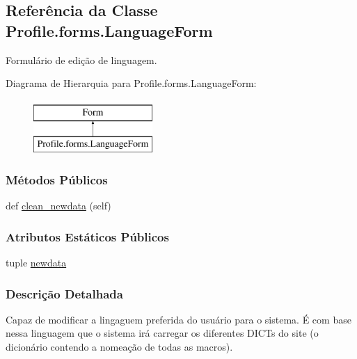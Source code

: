 \hypertarget{classProfile_1_1forms_1_1LanguageForm}{}\subsection{Referência da Classe Profile.\+forms.\+Language\+Form}
\label{classProfile_1_1forms_1_1LanguageForm}


Formulário de edição de linguagem.  


Diagrama de Hierarquia para Profile.\+forms.\+Language\+Form\+:\begin{figure}[H]
\begin{center}
\leavevmode
\includegraphics[height=2.000000cm]{de/d9b/classProfile_1_1forms_1_1LanguageForm}
\end{center}
\end{figure}
\subsubsection*{Métodos Públicos}
\begin{DoxyCompactItemize}
\item 
def \hyperlink{classProfile_1_1forms_1_1LanguageForm_aa293b46190ebac68d0d410406e83c01c}{clean\+\_\+newdata} (self)
\end{DoxyCompactItemize}
\subsubsection*{Atributos Estáticos Públicos}
\begin{DoxyCompactItemize}
\item 
tuple \hyperlink{classProfile_1_1forms_1_1LanguageForm_a327d764765fba9b8d9d82c86ca7e08a6}{newdata}
\end{DoxyCompactItemize}


\subsubsection{Descrição Detalhada}
Capaz de modificar a lingaguem preferida do usuário para o sistema. É com base nessa linguagem que o sistema irá carregar os diferentes D\+I\+C\+Ts do site (o dicionário contendo a nomeação de todas as macros). 

